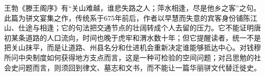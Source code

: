 王勃《滕王阁序》有“关山难越，谁悲失路之人；萍水相逢，尽是他乡之客”之句。此篇为骈文宴集之作，传统系于675年前后，作者以早慧而失意的宾客身份铺陈江山、仕途与相逢；它的句法把交通节点的壮阔转成个人去留的压力。它不能证明唐初某条道路的人口流向，时间也晚于虎牢和渭水数十年；但它提醒读者，统一不是把关山抹平，而是让道路、州县名分和仕进机会重新决定谁能够抵达中心。对钱穆所问中央制度如何获得地方支点而言，这是一种可检验的空间问题；对吕思勉的社会史问题而言，则须回到律文、墓志和文书，而不能让一篇华丽骈文代替迁徙史。
